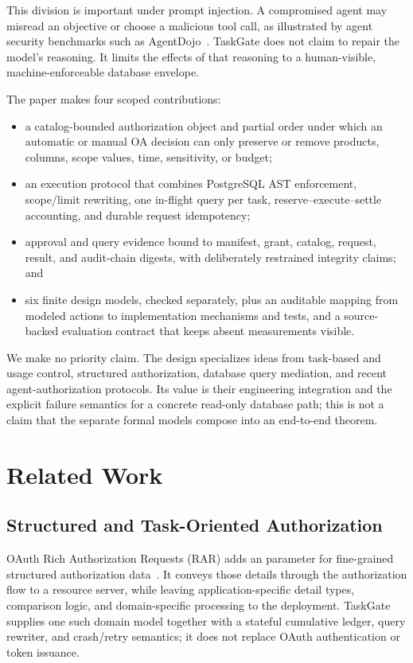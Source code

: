 \documentclass[10pt,journal,compsoc]{IEEEtran}
\newcommand{\system}{TaskGate\xspace}
\newcommand{\code}[1]{\texttt{\detokenize{#1}}}
\begin{document}
This division is important under prompt injection.  A compromised agent may
misread an objective or choose a malicious tool call, as illustrated by agent
security benchmarks such as AgentDojo~\cite{debenedetti2024agentdojo}.  \system
does not claim to repair the model's reasoning.  It limits the effects of that
reasoning to a human-visible, machine-enforceable database envelope.

The paper makes four scoped contributions:

\begin{itemize}
  \item a catalog-bounded authorization object and partial order under which an
  automatic or manual OA decision can only preserve or remove products, columns,
  scope values, time, sensitivity, or budget;
  \item an execution protocol that combines PostgreSQL AST enforcement,
  scope/limit rewriting, one in-flight query per task, reserve--execute--settle
  accounting, and durable request idempotency;
  \item approval and query evidence bound to manifest, grant, catalog, request,
  result, and audit-chain digests, with deliberately restrained integrity
  claims; and
  \item six finite design models, checked separately, plus an auditable mapping
  from modeled actions to implementation mechanisms and tests, and a
  source-backed evaluation contract that keeps absent measurements visible.
\end{itemize}

We make no priority claim.  The design specializes ideas from task-based and
usage control, structured authorization, database query mediation, and recent
agent-authorization protocols.  Its value is their engineering integration and
the explicit failure semantics for a concrete read-only database path; this is
not a claim that the separate formal models compose into an end-to-end theorem.

\section{Related Work}
\label{sec:related}

\subsection{Structured and Task-Oriented Authorization}

OAuth Rich Authorization Requests (RAR) adds an
\code{authorization_details} parameter for fine-grained structured
authorization data~\cite{rfc9396}.  It conveys those details through the
authorization flow to a resource server, while leaving application-specific
detail types, comparison logic, and domain-specific processing to the
deployment.  \system supplies one such domain model together with a stateful
cumulative ledger, query rewriter, and crash/retry semantics; it does not
replace OAuth authentication or token issuance.
\end{document}
